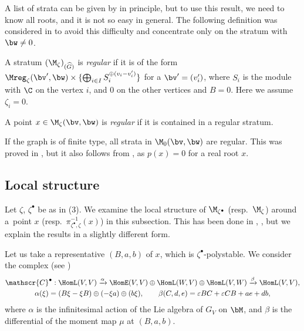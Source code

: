 A list of strata can be given by  in principle, but to
use this result, we need to know all roots, and it is not so easy in
general.
%
The following def\/inition was considered in \cite[2.6.4]{Na-qaff} to
avoid this dif\/f\/iculty and concentrate only on the stratum with $\bw
\neq 0$.

\begin{Definition}
  A stratum $(\M_\zeta)_{(\widehat G)}$ is {\it regular\/} if it is of
  the form $\Mreg_\zeta(\bv',\bw)\times\{ \bigoplus_{i\in I}
  S_i^{\oplus (v_i - v'_i)}\}$ for a $\bv' = (v'_i)$, where $S_i$ is
  the module with $\C$ on the vertex $i$, and $0$ on the other
  vertices and $B = 0$. Here we assume $\zeta_i = 0$.

  A point $x\in\M_\zeta(\bv,\bw)$ is {\it regular\/} if it is contained in
  a regular stratum.
\end{Definition}

If the graph is of f\/inite type, all strata in $\M_0(\bv,\bw)$ are
regular. This was proved in \cite[6.7]{Na-quiver}, but it also follows
from , as $p(x) = 0$ for a real root $x$.

\subsection{Local structure}\label{subsec:local}

Let $\zeta$, $\zeta^\bullet$ be as in (3).
%
We examine the local structure of $\M_{\zeta^\bullet}$ (resp.\ $\M_{\zeta}$)
around a~point $x$ (resp.\ $\pi_{\zeta^\bullet,\zeta}^{-1}(x)$) in this
subsection. This has been done in \cite[Section~6]{Na-quiver},
\cite[Section~3.2]{Na-qaff}, but we explain the results in a slightly
dif\/ferent form.

Let us take a representative $(B,a,b)$ of $x$, which is
$\zeta^\bullet$-polystable. We consider the complex (see
\cite[(3.11)]{Na-alg})
\begin{gather}
   \mathscr{C}^\bullet :
   \HomL(V,V) \xrightarrow{\alpha}
   \HomE(V,V)\oplus\HomL(W,V) \oplus \HomL(V,W) \xrightarrow{\beta}
   \HomL(V,V),
\nonumber\\
   \alpha(\xi) = (B\xi-\xi B)\oplus (-\xi a) \oplus (b\xi), \qquad
   \beta(C,d,e) = \varepsilon B C + \varepsilon C B + a e + d b,\label{eq:tancpx}
\end{gather}
where $\alpha$ is the inf\/initesimal action of the Lie algebra of $G_V$
on $\bM$, and $\beta$ is the dif\/ferential of the moment map $\mu$ at
$(B,a,b)$.

